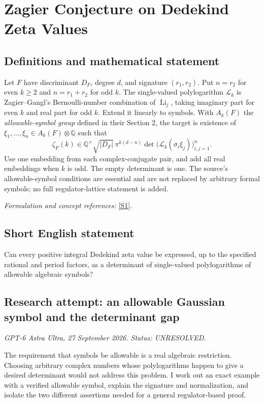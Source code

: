 \documentclass[11pt]{article}
\begin{document}
\section*{\texorpdfstring{Zagier Conjecture on Dedekind Zeta Values}{Zagier Conjecture on Dedekind Zeta Values}}\label{statement}
\subsection{Definitions and mathematical statement}
Let $F$ have discriminant $D_F$, degree $d$, and signature $(r_1,r_2)$. Put $n=r_2$ for even $k\ge2$ and $n=r_1+r_2$ for odd $k$. The single-valued polylogarithm $\mathcal L_k$ is Zagier--Gangl's Bernoulli-number combination of $\operatorname{Li}_j$, taking imaginary part for even $k$ and real part for odd $k$. Extend it linearly to symbols. With $A_k(F)$ the \emph{allowable-symbol group} defined in their Section 2, the target is existence of $\xi_1,\ldots,\xi_n\in A_k(F)\otimes{\mathbb{Q}}$ such that
\[
 \zeta_F(k)\in{\mathbb{Q}}^\times\sqrt{|D_F|}\,
 \pi^{k(d-n)}\det\bigl(\mathcal L_k(\sigma_i\xi_j)\bigr)_{i,j=1}^n.
\]
Use one embedding from each complex-conjugate pair, and add all real embeddings when $k$ is odd. The empty determinant is one. The source's allowable-symbol conditions are essential and are not replaced by arbitrary formal symbols; no full regulator-lattice statement is added.
\par\smallskip\textit{Formulation and concept references:} \href{https://people.mpim-bonn.mpg.de/zagier/files/mpim/00-9/fulltext.pdf}{[S1]}.

\subsection{Short English statement}
Can every positive integral Dedekind zeta value be expressed, up to the specified rational and period factors, as a determinant of single-valued polylogarithms of allowable algebraic symbols?
\subsection{Research attempt: an allowable Gaussian symbol and the determinant gap}
\textit{GPT-6 Astra Ultra, 27 September 2026. Status: UNRESOLVED.}

The requirement that symbols be allowable is a real algebraic restriction. Choosing arbitrary complex numbers whose polylogarithms happen to give a desired determinant would not address this problem. I work out an exact example with a verified allowable symbol, explain the signature and normalization, and isolate the two different assertions needed for a general regulator-based proof.
\end{document}
